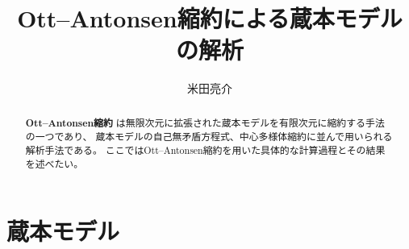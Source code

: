 \documentclass{jsarticle}
\begin{document}
\title{Ott--Antonsen縮約\cite{ott2008low,ott2009long}による蔵本モデルの解析}
\author{米田亮介}
\maketitle	

\begin{abstract}
\textbf{Ott--Antonsen縮約}\cite{ott2008low,ott2009long}
は無限次元に拡張された蔵本モデルを有限次元に縮約する手法の一つであり、
蔵本モデルの自己無矛盾方程式、中心多様体縮約に並んで用いられる解析手法である。
ここではOtt--Antonsen縮約を用いた具体的な計算過程とその結果を述べたい。
\end{abstract}

\section{蔵本モデル}



\end{document}
